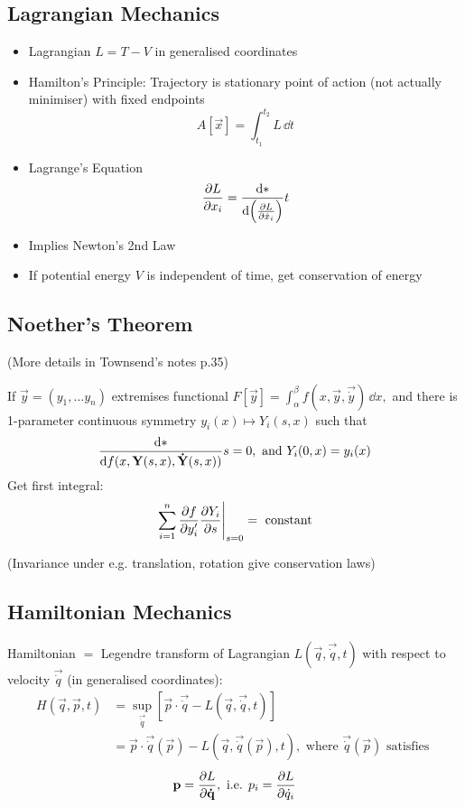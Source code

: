 \subsection*{Lagrangian Mechanics}
\begin{itemize}
    \item Lagrangian $L = T-V$ in generalised coordinates
    \item Hamilton's Principle: Trajectory is stationary point of action (not actually minimiser) with fixed endpoints \[A[\vec{x}] = \int_{t_1}^{t_2} L \, \dd t \]
    \item Lagrange's Equation \[\frac{\partial{L}}{\partial{x_i}} = \frac{\mathrm{d}{*}}{\mathrm{d}{\left(\frac{\partial{L}}{\partial{\dot{x}_i}}\right)}}{t}\]
    \item Implies Newton's 2nd Law
    \item If potential energy $V$ is independent of time, get conservation of energy
\end{itemize}

\subsection*{Noether's Theorem}
(More details in Townsend's notes p.35)

If $\vec{y} = (y_1,\dots y_n)$ extremises functional $F[\vec{y}] = \int_\alpha^\beta f(x, \vec{y} , \vec{\dot{y}}) \, \dd x,$
and there is 1-parameter continuous symmetry
$y_i(x) \mapsto Y_i(s,x)$ such that \[\frac{\mathrm{d}{*}}{\mathrm{d}{f(x, \boldsymbol{\mathbf{Y}}(s,x) , \boldsymbol{\mathbf{\dot{Y}}}(s,x))}}{s} = 0, \text{ and } Y_i(0,x) = y_i(x)\]
Get first integral: \[ \left. \sum_{i=1}^n \frac{\partial{f}}{\partial{y_i'}} \frac{\partial{Y_i}}{\partial{s}} \right|_{s=0} = \text{ constant}\]

(Invariance under e.g. translation, rotation give conservation laws)

\subsection*{Hamiltonian Mechanics}
Hamiltonian $=$ Legendre transform of Lagrangian $L(\vec{q}, \vec{\dot{q}},t)$ with respect to velocity $\vec{\dot{q}}$ (in generalised coordinates):
\begin{align*}
    H(\vec{q}, \vec{p}, t) & = \sup_{\vec{\dot{q}}} [\vec{p} \cdot \vec{\dot{q}} - L(\vec{q}, \vec{\dot{q}},t) ]                                                     \\
                           & = \vec{p} \cdot \vec{\dot{q}}(\vec{p}) - L(\vec{q}, \vec{\dot{q}}(\vec{p}),t), \text{ where } \vec{\dot{q}}(\vec{p}) \text{ satisfies }
\end{align*}
\[ \boldsymbol{\mathbf{p}} = \frac{\partial{L}}{\partial{\boldsymbol{\mathbf{\dot{q}}}}}, \text{ i.e. } p_i = \frac{\partial{L}}{\partial{\dot{q}_i}} \]

